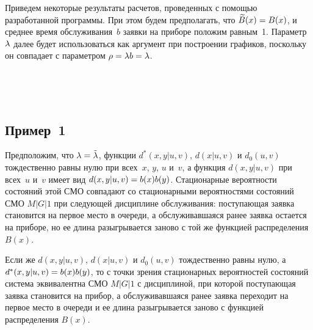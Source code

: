 \begin{multicols}{2}
Приведем некоторые результаты расчетов, проведенных с помощью разработанной программы.
При этом будем предполагать, что $\tB(x)\hm=B(x)$,
и среднее время обслуживания~$b$ заявки на приборе положим равным~1.
Параметр~$\lambda$ далее будет использоваться как аргумент при
построении графиков, поскольку он совпадает с
параметром $\rho\hm=\l b\hm=\l$.

\begin{figure*} %
\begin{minipage}[t]{80mm}
\vspace*{1pt}
\begin{center}
\mbox{%
\epsfxsize=73.96mm
}
\end{center}
\vspace*{-9pt}
\end{minipage}
\hfill
\begin{minipage}[t]{81.5mm}
\vspace*{1pt}
\begin{center}
\mbox{%
\epsfxsize=71.986mm
}
\end{center}
\vspace*{-9pt}
\end{minipage}
\end{figure*}

\subsection{Пример~1}

Предположим, что $\l\hm=\tl$, функции $d^*(x,y|u,v)$,
$d(x|u,v)$ и $d_0(u,v)$ тождественно равны нулю
при всех~$x$, $y$, $u$ и~$v$, а функция $d(x,y|u,v)$
при всех~$u$ и~$v$ имеет вид $d(x,y|u,v)\hm=b(x)b(y)$.
Стационарные вероятности состояний этой СМО
совпадают со стационарными вероятностями состояний
СМО $M|G|1$ при следующей дисциплине обслуживания:
поступающая заявка становится на первое место в
очереди, а обслуживавшаяся ранее заявка остается на
приборе, но ее длина разыгрывается заново с той же
функцией распределения $B(x)$.

Если же $d(x,y|u,v)$, $d(x|u,v)$ и $d_0(u,v)$
тождественно равны нулю, а $d^*(x,y|u,v)\hm=b(x)b(y)$,
то с точки зрения стационарных вероятностей
со\-сто\-яний сис\-те\-ма эквивалентна СМО $M|G|1$ с
дис\-цип\-ли\-ной, при которой поступающая заявка
становится на прибор, а обслуживавшаяся ранее заявка
переходит на первое место в очереди и ее длина
разыгрывается заново с функцией распределения $B(x)$.


\end{multicols}
